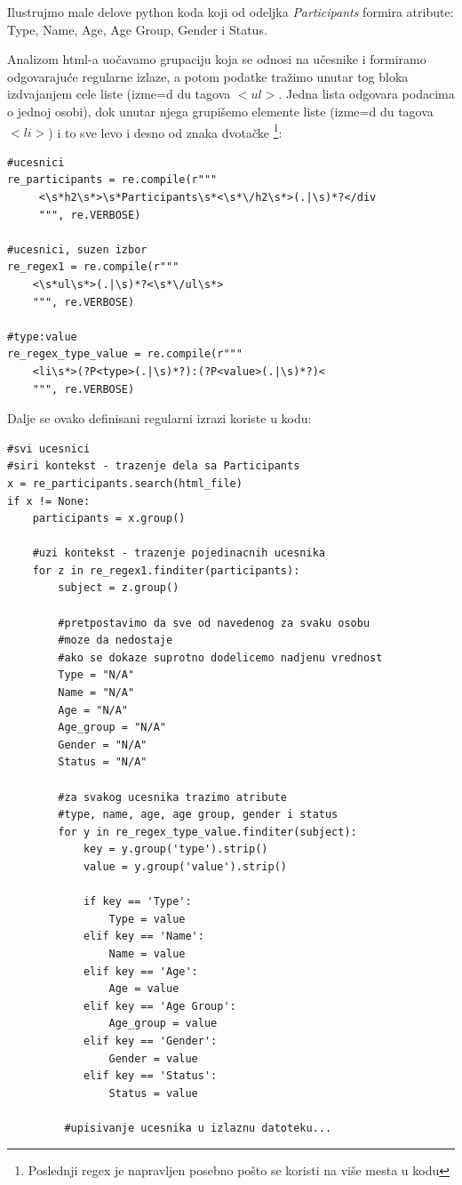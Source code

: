 \documentclass[12pt, a4paper]{article}
\def\dj{\leavevmode\setbox0=\hbox{d}\kern0pt
\rlap{\kern.215em\raise.46\ht0\hbox{-}}d}
\begin{document}
Ilustrujmo male delove python koda koji od odeljka \textit{Participants} formira atribute: Type, Name, Age, Age Group, Gender i Status.
\break

Analizom html-a uo\v cavamo grupaciju koja se odnosi na u\v cesnike i formiramo odgovaraju\' ce regularne izlaze, a potom podatke tra\v zimo unutar tog bloka izdvajanjem cele liste (izme\dj u tagova  $<ul>$. Jedna lista odgovara podacima o jednoj osobi), dok unutar njega grupi\v semo elemente liste (izme\dj u tagova  $<li>$) i to sve levo i desno od znaka dvota\v cke
\footnote{Poslednji regex je napravljen posebno po\v sto se koristi na vi\v se mesta u kodu}:

\newpage
\begin{lstlisting}
#ucesnici
re_participants = re.compile(r"""
     <\s*h2\s*>\s*Participants\s*<\s*\/h2\s*>(.|\s)*?</div
     """, re.VERBOSE)

#ucesnici, suzen izbor
re_regex1 = re.compile(r"""
    <\s*ul\s*>(.|\s)*?<\s*\/ul\s*>
    """, re.VERBOSE)
    
#type:value
re_regex_type_value = re.compile(r"""
    <li\s*>(?P<type>(.|\s)*?):(?P<value>(.|\s)*?)<
    """, re.VERBOSE)
\end{lstlisting}

Dalje se ovako definisani regularni izrazi koriste u kodu:
\begin{lstlisting}
#svi ucesnici
#siri kontekst - trazenje dela sa Participants
x = re_participants.search(html_file)
if x != None:
    participants = x.group()

	#uzi kontekst - trazenje pojedinacnih ucesnika
    for z in re_regex1.finditer(participants):
        subject = z.group()

		#pretpostavimo da sve od navedenog za svaku osobu 
		#moze da nedostaje
		#ako se dokaze suprotno dodelicemo nadjenu vrednost
        Type = "N/A"
        Name = "N/A"
        Age = "N/A"
        Age_group = "N/A"
        Gender = "N/A"
        Status = "N/A"

		#za svakog ucesnika trazimo atribute
		#type, name, age, age group, gender i status
        for y in re_regex_type_value.finditer(subject):
            key = y.group('type').strip()
            value = y.group('value').strip()

            if key == 'Type':
                Type = value
            elif key == 'Name':
                Name = value
            elif key == 'Age':
                Age = value
            elif key == 'Age Group':
                Age_group = value
            elif key == 'Gender':
                Gender = value
            elif key == 'Status':
                Status = value
                
         #upisivanje ucesnika u izlaznu datoteku...

\end{lstlisting}
\end{document}

